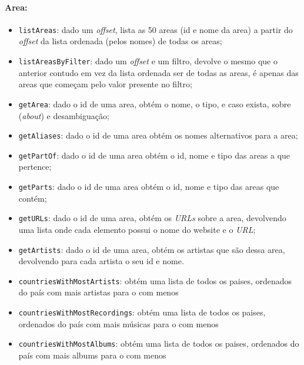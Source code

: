 \documentclass{article}
\begin{document}
\paragraph{\textbf{Area:}}
    \begin{itemize}
        \item \texttt{listAreas}: dado um \textit{offset}, lista as 50 areas (id e nome da area) a partir do \textit{offset} da lista ordenada (pelos nomes) de todas os areas;
        \item \texttt{listAreasByFilter}: dado um \textit{offset} e um filtro, devolve o mesmo que o anterior contudo em vez da lista ordenada ser de todas as areas, é apenas das areas que começam pelo valor presente no filtro;
        \item \texttt{getArea}: dado o id de uma area, obtém o nome, o tipo, e caso exista, sobre (\textit{about}) e desambiguação;
        \item \texttt{getAliases}: dado o id de uma area obtém os nomes alternativos para a area;
        \item \texttt{getPartOf}: dado o id de uma area obtém o id, nome e tipo das areas a que pertence;
        \item \texttt{getParts}: dado o id de uma area obtém o id, nome e tipo das areas que contém;
        \item \texttt{getURLs}: dado o id de uma area, obtém os \textit{URLs} sobre a area, devolvendo uma lista onde cada elemento possui o nome do website e o \textit{URL};
        \item \texttt{getArtists}: dado o id de uma area, obtém os artistas que são dessa area, devolvendo para cada artista o seu id e nome.
        \item \texttt{countriesWithMostArtists}: obtém uma lista de todos os paises, ordenados do país com mais artistas para o com menos
        \item \texttt{countriesWithMostRecordings}: obtém uma lista de todos os paises, ordenados do país com mais músicas para o com menos
        \item \texttt{countriesWithMostAlbums}: obtém uma lista de todos os paises, ordenados do país com mais albums para o com menos
    \end{itemize}
\end{document}
